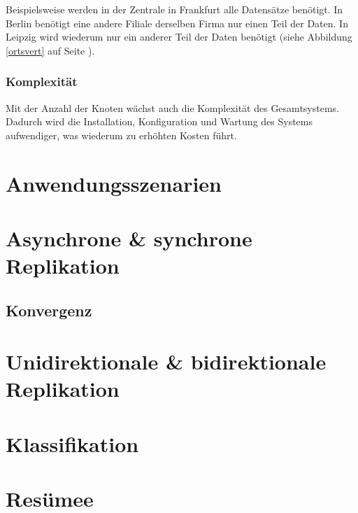 Beispielsweise werden in der Zentrale in Frankfurt alle Datensätze benötigt. In Berlin benötigt eine andere Filiale derselben Firma nur einen Teil der Daten. In Leipzig wird wiederum nur ein anderer Teil der Daten benötigt (siehe Abbildung \ref{ortsvert} auf Seite \pageref{ortsvert}).

\subsubsection{Komplexität}

Mit der Anzahl der Knoten wächst auch die Komplexität des Gesamtsystems. Dadurch wird die Installation, Konfiguration und Wartung des Systems aufwendiger, was wiederum zu erhöhten Kosten führt.

\section{Anwendungsszenarien}

\section{Asynchrone \& synchrone Replikation}

\subsection{Konvergenz}

\section{Unidirektionale \& bidirektionale Replikation}

\section{Klassifikation}

\section{Resümee}